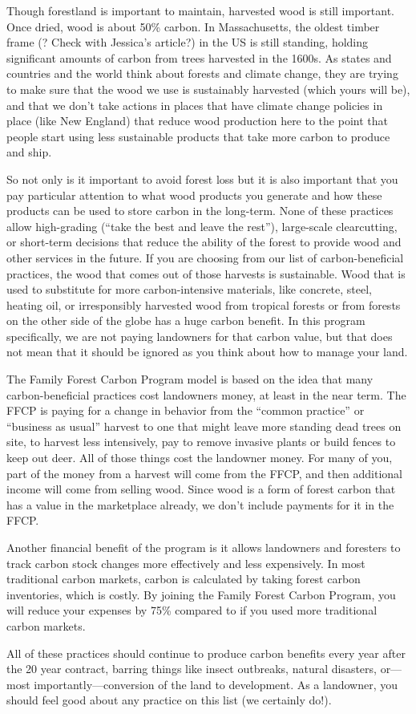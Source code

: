 \documentclass{article}\usepackage[]{graphicx}\usepackage[]{color}
\begin{document}
Though forestland is important to maintain, harvested wood is still important. Once dried, wood is about 50\% carbon. %
In Massachusetts, the oldest timber frame (? Check with Jessica's article?) in the US is still standing, holding significant amounts of carbon from trees harvested in the 1600s. As states and countries and the world think about forests and climate change, they are trying to make sure that the wood we use is sustainably harvested (which yours will be), and that we don’t take actions in places that have climate change policies in place (like New England) that reduce wood production here to the point that people start using less sustainable products that take more carbon to produce and ship.

So not only is it important to avoid forest loss but it is also important that you pay particular attention to what wood products you generate and how these products can be used to store carbon in the long-term. None of these practices allow high-grading (``take the best and leave the rest''), large-scale clearcutting, or short-term decisions that reduce the ability of the forest to provide wood and other services in the future. If you are choosing from our list of carbon-beneficial practices, the wood that comes out of those harvests is sustainable. Wood that is used to substitute for more carbon-intensive materials, like concrete, steel, heating oil, or irresponsibly harvested wood from tropical forests or from forests on the other side of the globe has a huge carbon benefit. In this program specifically, we are not paying landowners for that carbon value, but that does not mean that it should be ignored as you think about how to manage your land.

The Family Forest Carbon Program model is based on the idea that many carbon-beneficial practices cost landowners money, at least in the near term. The FFCP is paying for a change in behavior from the ``common practice'' or ``business as usual'' harvest to one that might leave more standing dead trees on site, to harvest less intensively, pay to remove invasive plants or build fences to keep out deer. All of those things cost the landowner money. For many of you, part of the money from a harvest will come from the FFCP, and then additional income will come from selling wood. Since wood is a form of forest carbon that has a value in the marketplace already, we don’t include payments for it in the FFCP.

Another financial benefit of the program is it allows landowners and foresters to track carbon stock changes more effectively and less expensively. In most traditional carbon markets, carbon is calculated by taking forest carbon inventories, which is costly. By joining the Family Forest Carbon Program, you will reduce your expenses by 75\% compared to if you used more traditional carbon markets. 

All of these practices should continue to produce carbon benefits every year after the 20 year contract, barring things like insect outbreaks, natural disasters, or---most importantly---conversion of the land to development. As a landowner, you should feel good about any practice on this list (we certainly do!).
\end{document}
